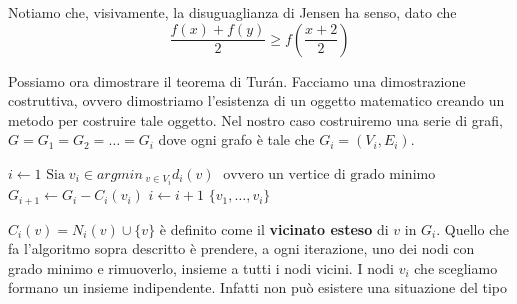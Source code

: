 \documentclass[12pt]{report}
\begin{document}
\vspace{5px}
\noindent 
Notiamo che, visivamente, la disuguaglianza di Jensen ha senso, dato che $$\frac{f(x) + f(y)}{2} \geq f(\frac{x+2}{2})$$

\begin{dimo}
    Possiamo ora dimostrare il teorema di Turán. Facciamo una dimostrazione costruttiva, ovvero dimostriamo l'esistenza di un oggetto matematico creando un metodo per costruire tale oggetto. Nel nostro caso costruiremo una serie di grafi, $G = G_1 = G_2 = \dots = G_i$ dove ogni grafo è tale che $G_i = (V_i,E_i)$.

\begin{algorithm}
\caption{}\label{euclid}
\begin{algorithmic}[1]
\State $i \gets 1$
\State $\text{Sia} \; v_i \in argmin_{\;v \in V_i} d_i(v) \;$ $\text{ovvero un vertice di grado}$ $\text{minimo}$
\State $G_{i+1} \gets G_i - C_i(v_i)$
\State $i \gets i + 1$
\EndWhile
\State \Return $\{v_1,\dots,v_i\}$
\end{algorithmic}
\end{algorithm}

\noindent 
$C_i(v) = N_i(v) \cup \{v\}$ è definito come il \textbf{vicinato esteso} di $v$ in $G_i$. Quello che fa l'algoritmo sopra descritto è prendere, a ogni iterazione, uno dei nodi con grado minimo e rimuoverlo, insieme a tutti i nodi vicini.
I nodi $v_i$ che scegliamo formano un insieme indipendente. Infatti non può esistere una situazione del tipo

\vspace{5px}

\begin{center}
\end{center}


\end{dimo}
\end{document}
